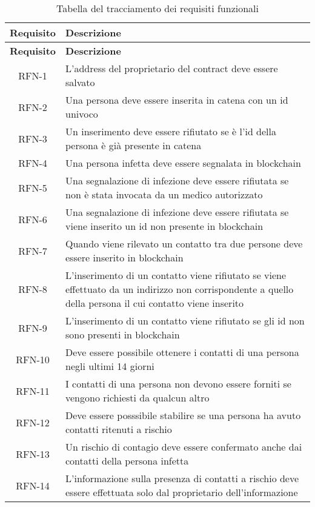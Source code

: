 \begin{center}
		\begin{longtable}{| c | p{30em} |}
			\caption{Tabella del tracciamento dei requisiti funzionali}
			\label{tab:requisiti-funzionali}\\
			\hline
			\textbf{Requisito} & \centering\textbf{Descrizione}\\
			\endfirsthead
			\hline
			\textbf{Requisito} & \centering\textbf{Descrizione}\\
			\endhead
			\endfoot
			
			\hline
			RFN-1     & L'address del proprietario del contract deve essere salvato\\
			\hline
			RFN-2     & Una persona deve essere inserita in catena con un id univoco \\
			\hline
			RFN-3     & Un inserimento deve essere rifiutato se è l'id della persona è già presente in catena \\
			\hline
			RFN-4     & Una persona infetta deve essere segnalata in blockchain \\
			\hline
			RFN-5     & Una segnalazione di infezione deve essere rifiutata se non è stata invocata da un medico autorizzato \\
			\hline
			RFN-6     & Una segnalazione di infezione deve essere rifiutata se viene inserito un id non presente in blockchain \\
			\hline
			RFN-7     & Quando viene rilevato un contatto tra due persone deve essere inserito in blockchain\\
			\hline
			RFN-8     & L'inserimento di un contatto viene rifiutato se viene effettuato da un indirizzo non corrispondente a quello della persona il cui contatto viene inserito \\
			\hline
			RFN-9     & L'inserimento di un contatto viene rifiutato se gli id non sono presenti in blockchain \\
			\hline
			RFN-10   & Deve essere possibile ottenere i contatti di una persona negli ultimi 14 giorni \\
			\hline
			RFN-11   & I contatti di una persona non devono essere forniti se vengono richiesti da qualcun altro\\
			\hline
			RFN-12   & Deve essere posssibile stabilire se una persona ha avuto contatti ritenuti a rischio \\
			\hline
			RFN-13   & Un rischio di contagio deve essere confermato anche dai contatti della persona infetta \\
			\hline
			RFN-14   & L'informazione sulla presenza di contatti a rischio deve essere effettuata solo dal proprietario dell'informazione \\

\end{longtable}
\end{center}

